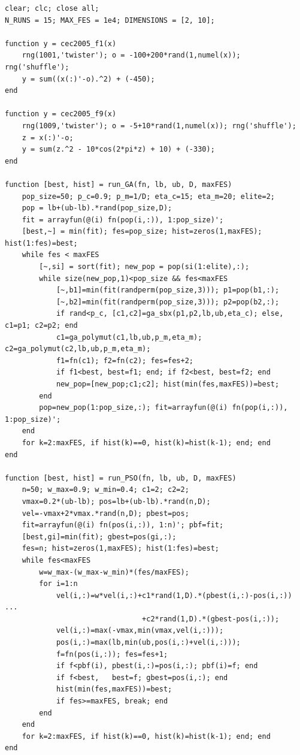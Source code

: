 \documentclass[10pt,twocolumn,a4paper]{article}
\begin{document}
\begin{lstlisting}[caption={Part 3: GA vs PSO comparison on F1 (Sphere) and F9 (Rastrigin), 15 independent runs each.}]
clear; clc; close all;
N_RUNS = 15; MAX_FES = 1e4; DIMENSIONS = [2, 10];

function y = cec2005_f1(x)
    rng(1001,'twister'); o = -100+200*rand(1,numel(x)); rng('shuffle');
    y = sum((x(:)'-o).^2) + (-450);
end

function y = cec2005_f9(x)
    rng(1009,'twister'); o = -5+10*rand(1,numel(x)); rng('shuffle');
    z = x(:)'-o;
    y = sum(z.^2 - 10*cos(2*pi*z) + 10) + (-330);
end

function [best, hist] = run_GA(fn, lb, ub, D, maxFES)
    pop_size=50; p_c=0.9; p_m=1/D; eta_c=15; eta_m=20; elite=2;
    pop = lb+(ub-lb).*rand(pop_size,D);
    fit = arrayfun(@(i) fn(pop(i,:)), 1:pop_size)';
    [best,~] = min(fit); fes=pop_size; hist=zeros(1,maxFES); hist(1:fes)=best;
    while fes < maxFES
        [~,si] = sort(fit); new_pop = pop(si(1:elite),:);
        while size(new_pop,1)<pop_size && fes<maxFES
            [~,b1]=min(fit(randperm(pop_size,3))); p1=pop(b1,:);
            [~,b2]=min(fit(randperm(pop_size,3))); p2=pop(b2,:);
            if rand<p_c, [c1,c2]=ga_sbx(p1,p2,lb,ub,eta_c); else, c1=p1; c2=p2; end
            c1=ga_polymut(c1,lb,ub,p_m,eta_m); c2=ga_polymut(c2,lb,ub,p_m,eta_m);
            f1=fn(c1); f2=fn(c2); fes=fes+2;
            if f1<best, best=f1; end; if f2<best, best=f2; end
            new_pop=[new_pop;c1;c2]; hist(min(fes,maxFES))=best;
        end
        pop=new_pop(1:pop_size,:); fit=arrayfun(@(i) fn(pop(i,:)), 1:pop_size)';
    end
    for k=2:maxFES, if hist(k)==0, hist(k)=hist(k-1); end; end
end

function [best, hist] = run_PSO(fn, lb, ub, D, maxFES)
    n=50; w_max=0.9; w_min=0.4; c1=2; c2=2;
    vmax=0.2*(ub-lb); pos=lb+(ub-lb).*rand(n,D);
    vel=-vmax+2*vmax.*rand(n,D); pbest=pos;
    fit=arrayfun(@(i) fn(pos(i,:)), 1:n)'; pbf=fit;
    [best,gi]=min(fit); gbest=pos(gi,:);
    fes=n; hist=zeros(1,maxFES); hist(1:fes)=best;
    while fes<maxFES
        w=w_max-(w_max-w_min)*(fes/maxFES);
        for i=1:n
            vel(i,:)=w*vel(i,:)+c1*rand(1,D).*(pbest(i,:)-pos(i,:)) ...
                                +c2*rand(1,D).*(gbest-pos(i,:));
            vel(i,:)=max(-vmax,min(vmax,vel(i,:)));
            pos(i,:)=max(lb,min(ub,pos(i,:)+vel(i,:)));
            f=fn(pos(i,:)); fes=fes+1;
            if f<pbf(i), pbest(i,:)=pos(i,:); pbf(i)=f; end
            if f<best,   best=f; gbest=pos(i,:); end
            hist(min(fes,maxFES))=best;
            if fes>=maxFES, break; end
        end
    end
    for k=2:maxFES, if hist(k)==0, hist(k)=hist(k-1); end; end
end
\end{lstlisting}
\end{document}
